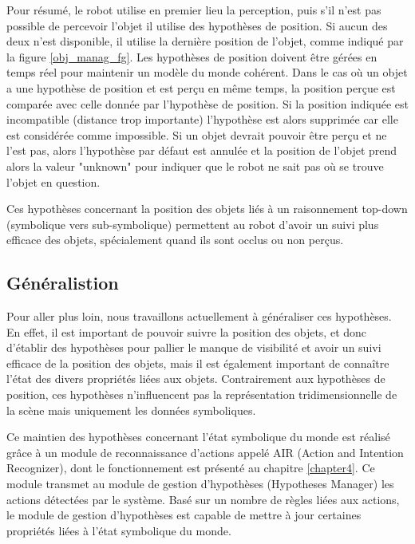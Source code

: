 \documentclass[a4paper,11pt,twoside]{StyleThese}
\begin{document}
Pour résumé, le robot utilise en premier lieu la perception, puis s'il n'est pas possible de percevoir l'objet il utilise des hypothèses de position.
Si aucun des deux n'est disponible, il utilise la dernière position de l'objet, comme indiqué par la figure \ref{obj_manag_fg}.
Les hypothèses de position doivent être gérées en temps réel pour maintenir un modèle du monde cohérent.
Dans le cas où un objet a une hypothèse de position et est perçu en même temps, la position perçue est comparée avec celle donnée par l'hypothèse de position. Si la  position indiquée est incompatible (distance trop importante) l'hypothèse est alors supprimée car elle est considérée comme impossible.
Si un objet devrait pouvoir être perçu et ne l'est pas, alors l'hypothèse par défaut est annulée et la position de l'objet prend alors la valeur "unknown" pour indiquer que le robot ne sait pas où se trouve l'objet en question.

Ces hypothèses concernant la position des objets liés à un raisonnement top-down (symbolique vers sub-symbolique) permettent au robot d'avoir un suivi plus efficace des objets, spécialement quand ils sont occlus ou non perçus.


\subsection{Généralistion}



Pour aller plus loin, nous travaillons actuellement à généraliser ces hypothèses. En effet, il est important de pouvoir suivre la position des objets, et donc d'établir des hypothèses pour pallier le manque de visibilité et avoir un suivi efficace de la position des objets, mais il est également important de connaître l'état des divers propriétés liées aux objets. Contrairement aux hypothèses de position, ces hypothèses n'influencent pas la représentation tridimensionnelle de la scène mais uniquement les données symboliques.

Ce maintien des hypothèses concernant l'état symbolique du monde est réalisé grâce à un module de reconnaissance d'actions appelé AIR (Action and Intention Recognizer), dont le fonctionnement est présenté au chapitre \ref{chapter4}.
Ce module transmet au module de gestion d'hypothèses (Hypotheses Manager) les actions détectées par le système.
Basé sur un nombre de règles liées aux actions, le module de gestion d'hypothèses est capable de mettre à jour certaines propriétés liées à l'état symbolique du monde.
\end{document}
